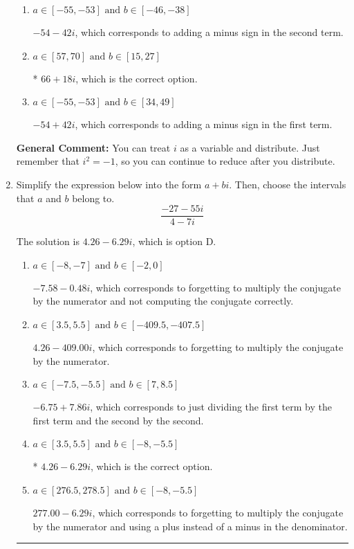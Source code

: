 \documentclass{extbook}[14pt]
\newcommand{\litem}[1]{\item #1

\rule{\textwidth}{0.4pt}}
\begin{document}
\begin{enumerate}
{\begin{enumerate}[label=\Alph*.]
 $66 - 18 i$, which corresponds to adding a minus sign in both terms.
\item \( a \in [-55, -53] \text{ and } b \in [-46, -38] \)

 $-54 - 42 i$, which corresponds to adding a minus sign in the second term.
\item \( a \in [57, 70] \text{ and } b \in [15, 27] \)

* $66 + 18 i$, which is the correct option.
\item \( a \in [-55, -53] \text{ and } b \in [34, 49] \)

 $-54 + 42 i$, which corresponds to adding a minus sign in the first term.
\end{enumerate}

\textbf{General Comment:} You can treat $i$ as a variable and distribute. Just remember that $i^2=-1$, so you can continue to reduce after you distribute.
}
\litem{
Simplify the expression below into the form $a+bi$. Then, choose the intervals that $a$ and $b$ belong to.
\[ \frac{-27 - 55 i}{4 - 7 i} \]

The solution is \( 4.26  - 6.29 i \), which is option D.\begin{enumerate}[label=\Alph*.]
\item \( a \in [-8, -7] \text{ and } b \in [-2, 0] \)

 $-7.58  - 0.48 i$, which corresponds to forgetting to multiply the conjugate by the numerator and not computing the conjugate correctly.
\item \( a \in [3.5, 5.5] \text{ and } b \in [-409.5, -407.5] \)

 $4.26  - 409.00 i$, which corresponds to forgetting to multiply the conjugate by the numerator.
\item \( a \in [-7.5, -5.5] \text{ and } b \in [7, 8.5] \)

 $-6.75  + 7.86 i$, which corresponds to just dividing the first term by the first term and the second by the second.
\item \( a \in [3.5, 5.5] \text{ and } b \in [-8, -5.5] \)

* $4.26  - 6.29 i$, which is the correct option.
\item \( a \in [276.5, 278.5] \text{ and } b \in [-8, -5.5] \)

 $277.00  - 6.29 i$, which corresponds to forgetting to multiply the conjugate by the numerator and using a plus instead of a minus in the denominator.
\end{enumerate}

}
\end{enumerate}
\end{document}
